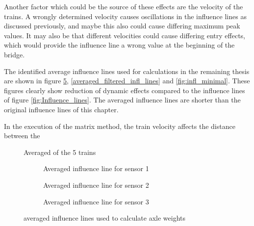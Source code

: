 Another factor which could be the source of these effects are the velocity of the trains. A wrongly determined velocity causes oscillations in the influence lines as discussed previously, and maybe this also could cause differing maximum peak values.
It may also be that different velocities could cause differing entry effects, which would provide the influence line a wrong value at the beginning of the bridge.

The identified average influence lines used for calculations in the remaining thesis are shown in figure \ref{averaged_infl_lines}, \ref{averaged_filtered_infl_lines} and \ref{fig:infl_minimal}. These figures clearly show reduction of dynamic effects compared to the influence lines of figure \ref{fig:Influence_lines}. The averaged influence lines are shorter than the original influence lines of this chapter.



In the execution of the matrix method, the train velocity affects the distance between the
\begin{figure}[H]
	\begin{adjustbox}{center}
		
	\end{adjustbox}
	\caption{Averaged of the 5 trains}
	\label{fig:infl_vec_averaged_wBridge}
\end{figure}
\begin{figure}[h!]
	\begin{subfigure}[t]{0.8\textwidth}
		
		\caption{Averaged influence line for sensor 1}
		\label{fig:sensor1_averaged}
	\end{subfigure}
	\begin{subfigure}[t]{0.8\textwidth}
		
		\caption{Averaged influence line for sensor 2}
		\label{fig:sensor2_averaged}
	\end{subfigure}
	\begin{subfigure}[t]{0.8\textwidth}
		
		\caption{Averaged influence line for sensor 3}
		\label{fig:sensor3_averaged}
	\end{subfigure}
	\caption{averaged influence lines used to calculate axle weights}
	\label{averaged_infl_lines}
\end{figure}
% 		

